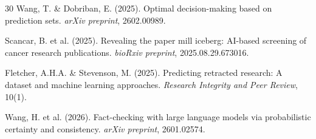 \documentclass[sigconf,nonacm]{acmart}
\begin{document}
\begin{thebibliography}{30}
Wang, T. \& Dobriban, E. (2025).
\newblock Optimal decision-making based on prediction sets.
\newblock \emph{arXiv preprint}, 2602.00989.

Scancar, B. et al. (2025).
\newblock Revealing the paper mill iceberg: AI-based screening of cancer research publications.
\newblock \emph{bioRxiv preprint}, 2025.08.29.673016.

Fletcher, A.H.A. \& Stevenson, M. (2025).
\newblock Predicting retracted research: A dataset and machine learning approaches.
\newblock \emph{Research Integrity and Peer Review}, 10(1).

Wang, H. et al. (2026).
\newblock Fact-checking with large language models via probabilistic certainty and consistency.
\newblock \emph{arXiv preprint}, 2601.02574.

\end{thebibliography}
\end{document}
